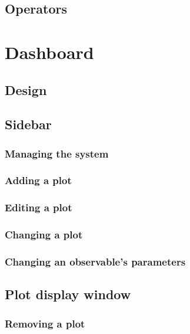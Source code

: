         \subsection{Operators}
   \section{Dashboard}
        \subsection{Design}
        \subsection{Sidebar}
            \subsubsection{Managing the system}
            
            \subsubsection{Adding a plot}
            \subsubsection{Editing a plot}
            \subsubsection{Changing a plot}
            \subsubsection{Changing an observable's parameters}
        \subsection{Plot display window}
            \subsubsection{Removing a plot}
        
